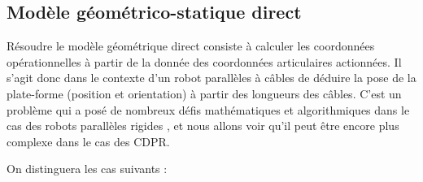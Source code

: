 \subsection{Modèle géométrico-statique direct}\label{chap0-2-4}

Résoudre le modèle géométrique direct consiste à calculer les coordonnées 
opéra\-tionnelles à partir de la donnée des coordonnées articulaires 
actionn\'ees. Il s'agit donc dans le contexte d'un robot parallèles à câbles de 
déduire la pose de la plate-forme (position et orientation) à partir des 
longueurs des câbles. C'est un problème qui a posé de nombreux défis 
mathématiques et algorithmiques dans le cas des robots parallèles rigides 
\cite{merlet1997robots}, et nous allons voir qu'il peut \^etre encore plus 
complexe dans le cas des CDPR.

On distinguera les cas suivants :
